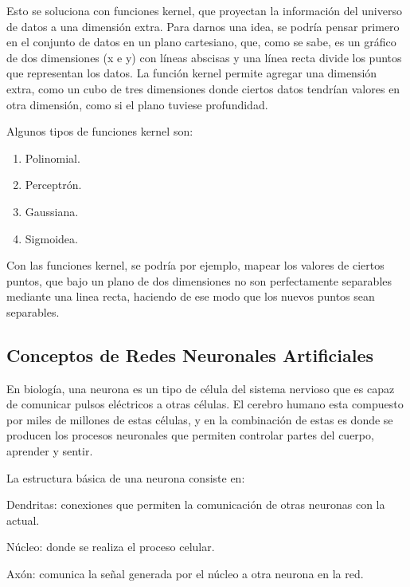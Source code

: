 \documentclass[a4paper,12pt,oneside,spanish]{book}
\begin{document}
Esto se soluciona con funciones kernel, que proyectan la información del universo de datos a una dimensión extra. Para darnos una idea, se podría pensar primero en el conjunto de datos en un plano cartesiano, que, como se sabe, es un gráfico de dos dimensiones (x e y) con líneas abscisas y una línea recta divide los puntos que representan los datos. La función kernel permite agregar una dimensión extra, como un cubo de tres dimensiones donde ciertos datos tendrían valores en otra dimensión, como si el plano tuviese profundidad. \par

Algunos tipos de funciones kernel son: \par

\begin{enumerate}[noitemsep]
	\item Polinomial.
	\item Perceptrón.
	\item Gaussiana.
	\item Sigmoidea.
\end{enumerate}

Con las funciones kernel, se podría por ejemplo, mapear los valores de ciertos puntos, que bajo un plano de dos dimensiones no son perfectamente separables mediante una linea recta, haciendo de ese modo que los nuevos puntos sean separables.

\subsection{Conceptos de Redes Neuronales Artificiales}

En biología, una neurona es un tipo de célula del sistema nervioso que es capaz de comunicar pulsos eléctricos a otras células. El cerebro humano esta compuesto por miles de millones de estas células, y en la combinación de estas es donde se producen los procesos neuronales que permiten controlar partes del cuerpo, aprender y sentir. \par

La estructura básica de una neurona consiste en:
\begin{compactitem}
	\item Dendritas: conexiones que permiten la comunicación de otras neuronas con la actual.
	\item Núcleo: donde se realiza el proceso celular.
	\item Axón: comunica la señal generada por el núcleo a otra neurona en la red.
\end{compactitem}
\end{document}
